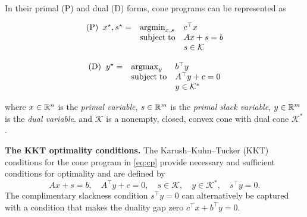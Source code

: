 In their primal (P) and dual (D) forms,
cone programs can be represented as \\
\begin{minipage}{0.45\textwidth}
  \begin{equation*}
    \begin{array}{lll}
      \text{(P)}\;\; {x^\star}, {s^\star} =
      &\operatorname*{argmin}_{x,s} &c^\top x\\
      &\operatorname*{subject\;to} &  Ax+s=b\\
      &  &s\in  \mathcal{K}
    \end{array}
  \end{equation*}
  \vspace{3mm}
\end{minipage}
\hfill
\begin{minipage}{0.5\textwidth}
  \begin{equation}
    \label{eq:cp}
    \begin{array}{lll}
      \text{(D)}\;\; {y^\star} =
      & \operatorname*{argmax}_y & b^\top y\\
      &\operatorname*{subject\;to} & A^\top y+c=0\\
      &&y\in  \mathcal{K}^*
    \end{array}
  \end{equation}
  \vspace{3mm}
\end{minipage}
where $x\in\mathbb{R}^n$ is the \emph{primal variable},
$s\in\mathbb{R}^m$ is the \emph{primal slack variable},
$y\in\mathbb{R}^m$ is the \emph{dual variable}.
and $\mathcal{K}$ is a nonempty, closed, convex cone
with dual cone $\mathcal{K}^*$.

\textbf{The KKT optimality conditions.}
The Karush--Kuhn--Tucker (KKT) conditions for the
cone program in \cref{eq:cp} provide
necessary and sufficient conditions for optimality
and are defined by
\begin{equation}
\label{eq:cp-kkt}
Ax +s =b, \quad
A^\top y + c = 0, \quad
s \in \mathcal{K}, \quad
y \in \mathcal{K}^*, \quad
s^\top y = 0.
\end{equation}
The complimentary slackness condition $s^\top y = 0$ can
alternatively be captured with a condition that
makes the duality gap zero $c^\top x + b^\top y = 0$.

